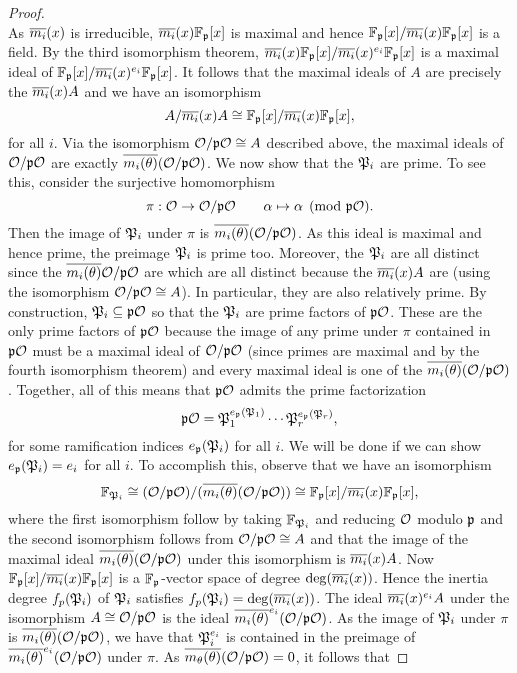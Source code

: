 \begin{proof}
\[      \]
      As $\overline{m_{i}}(x)$ is irreducible, $\overline{m_{i}}(x)\mathbb{F}_{\mathfrak{p}}[x]$ is maximal and hence $\mathbb{F}_{\mathfrak{p}}[x]/\overline{m_{i}}(x)\mathbb{F}_{\mathfrak{p}}[x]$ is a field. By the third isomorphism theorem, $\overline{m_{i}}(x)\mathbb{F}_{\mathfrak{p}}[x]/\overline{m_{i}}(x)^{e_{i}}\mathbb{F}_{\mathfrak{p}}[x]$ is a maximal ideal of $\mathbb{F}_{\mathfrak{p}}[x]/\overline{m_{i}}(x)^{e_{i}}\mathbb{F}_{\mathfrak{p}}[x]$. It follows that the maximal ideals of $A$ are precisely the $\overline{m_{i}}(x)A$ and we have an isomorphism
      \[
        A/\overline{m_{i}}(x)A \cong \mathbb{F}_{\mathfrak{p}}[x]/\overline{m_{i}}(x)\mathbb{F}_{\mathfrak{p}}[x],
      \]
      for all $i$. Via the isomorphism $\mathcal{O}/\mathfrak{p}\mathcal{O} \cong A$ described above, the maximal ideals of $\mathcal{O}/\mathfrak{p}\mathcal{O}$ are exactly $\overline{m_{i}(\theta)}(\mathcal{O}/\mathfrak{p}\mathcal{O})$. We now show that the $\mathfrak{P}_{i}$ are prime. To see this, consider the surjective homomorphism
      \[
        \pi:\mathcal{O} \to \mathcal{O}/\mathfrak{p}\mathcal{O} \qquad \alpha \mapsto \alpha \pmod{\mathfrak{p}\mathcal{O}}.
      \]
      Then the image of $\mathfrak{P}_{i}$ under $\pi$ is $\overline{m_{i}(\theta)}(\mathcal{O}/\mathfrak{p}\mathcal{O})$. As this ideal is maximal and hence prime, the preimage $\mathfrak{P}_{i}$ is prime too. Moreover, the $\mathfrak{P}_{i}$ are all distinct since the $\overline{m_{i}(\theta)}\mathcal{O}/\mathfrak{p}\mathcal{O}$ are which are all distinct because the $\overline{m_{i}}(x)A$ are (using the isomorphism $\mathcal{O}/\mathfrak{p}\mathcal{O} \cong A$). In particular, they are also relatively prime. By construction, $\mathfrak{P}_{i} \subseteq \mathfrak{p}\mathcal{O}$ so that the $\mathfrak{P}_{i}$ are prime factors of $\mathfrak{p}\mathcal{O}$. These are the only prime factors of $\mathfrak{p}\mathcal{O}$ because the image of any prime under $\pi$ contained in $\mathfrak{p}\mathcal{O}$ must be a maximal ideal of $\mathcal{O}/\mathfrak{p}\mathcal{O}$ (since primes are maximal and by the fourth isomorphism theorem) and every maximal ideal is one of the $\overline{m_{i}(\theta)}(\mathcal{O}/\mathfrak{p}\mathcal{O})$. Together, all of this means that $\mathfrak{p}\mathcal{O}$ admits the prime factorization
      \[
        \mathfrak{p}\mathcal{O} = \mathfrak{P}_{1}^{e_{\mathfrak{p}}(\mathfrak{P}_{1})} \cdots \mathfrak{P}_{r}^{e_{\mathfrak{p}}(\mathfrak{P}_{r})},
      \]
      for some ramification indices $e_{\mathfrak{p}}(\mathfrak{P}_{i})$ for all $i$. We will be done if we can show $e_{\mathfrak{p}}(\mathfrak{P}_{i}) = e_{i}$ for all $i$. To accomplish this, observe that we have an isomorphism
      \[
        \mathbb{F}_{\mathfrak{P}_{i}} \cong (\mathcal{O}/\mathfrak{p}\mathcal{O})/(\overline{m_{i}(\theta)}(\mathcal{O}/\mathfrak{p}\mathcal{O})) \cong \mathbb{F}_{\mathfrak{p}}[x]/\overline{m_{i}}(x)\mathbb{F}_{\mathfrak{p}}[x],
      \]
      where the first isomorphism follow by taking $\mathbb{F}_{\mathfrak{P}_{i}}$ and reducing $\mathcal{O}$ modulo $\mathfrak{p}$ and the second isomorphism follows from $\mathcal{O}/\mathfrak{p}\mathcal{O} \cong A$ and that the image of the maximal ideal $\overline{m_{i}(\theta)}(\mathcal{O}/\mathfrak{p}\mathcal{O})$ under this isomorphism is $\overline{m_{i}}(x)A$. Now $\mathbb{F}_{\mathfrak{p}}[x]/\overline{m_{i}}(x)\mathbb{F}_{\mathfrak{p}}[x]$ is a $\mathbb{F}_{\mathfrak{p}}$-vector space of degree $\deg(\overline{m_{i}}(x))$. Hence the inertia degree $f_{p}(\mathfrak{P}_{i})$ of $\mathfrak{P}_{i}$ satisfies $f_{p}(\mathfrak{P}_{i}) = \deg(\overline{m_{i}}(x))$. The ideal $\overline{m_{i}}(x)^{e_{i}}A$ under the isomorphism $A \cong \mathcal{O}/\mathfrak{p}\mathcal{O}$ is the ideal $\overline{m_{i}(\theta)}^{e_{i}}(\mathcal{O}/\mathfrak{p}\mathcal{O})$. As the image of $\mathfrak{P}_{i}$ under $\pi$ is $\overline{m_{i}(\theta)}(\mathcal{O}/\mathfrak{p}\mathcal{O})$, we have that $\mathfrak{P}_{i}^{e_{i}}$ is contained in the preimage of $\overline{m_{i}(\theta)}^{e_{i}}(\mathcal{O}/\mathfrak{p}\mathcal{O})$ under $\pi$. As $\overline{m_{\theta}(\theta)}(\mathcal{O}/\mathfrak{p}\mathcal{O}) = 0$, it follows that

\end{proof}
